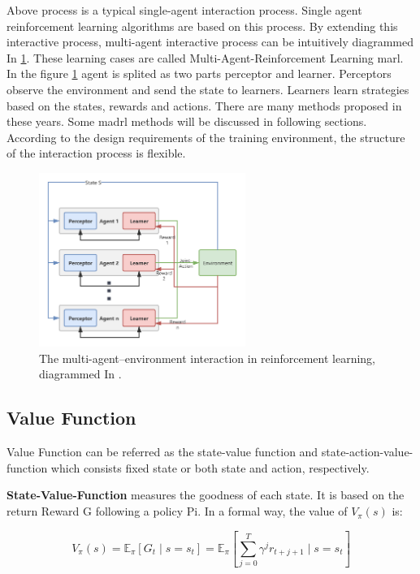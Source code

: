 Above process is a typical single-agent interaction process. Single agent reinforcement learning algorithms are based on this process. By extending this interactive process, multi-agent interactive process can be intuitively diagrammed In \ref{fig:multi-agent-environment-interaction}. These learning cases are called Multi-Agent-Reinforcement Learning \gls{marl}. In the figure \ref{fig:multi-agent-environment-interaction} agent is splited as two parts perceptor and learner. Perceptors observe the environment and send the state to learners. Learners learn strategies based on the states, rewards and actions. There are many methods proposed in these years. Some \gls{madrl} methods will be discussed in following sections. According to the design requirements of the training environment, the structure of the interaction process is flexible.

\begin{figure}[htbp]
\centering
\includegraphics[width=0.6\textwidth]{./images/multi-agent-environment-interaction.png}
\caption{The multi-agent–environment interaction in reinforcement learning, diagrammed In \parencite{en13010123}.}
\label{fig:multi-agent-environment-interaction}
\end{figure}

\subsection{Value Function} \label{background:value-function}
Value Function can be referred as the state-value function and state-action-value-function which consists fixed state or both state and action, respectively.

\textbf{State-Value-Function} measures the goodness of each state. It is based on the return Reward G following a policy Pi. In a formal way, the value of $V_\pi(s)$ is:

\begin{equation} 
V_{\pi}(s)=\mathbb{E}_{\pi}\left[G_{t} \mid s=s_{t}\right]=\mathbb{E}_{\pi}\left[\sum_{j=0}^{T} \gamma^{j} r_{t+j+1} \mid s=s_{t}\right]
\end{equation}

